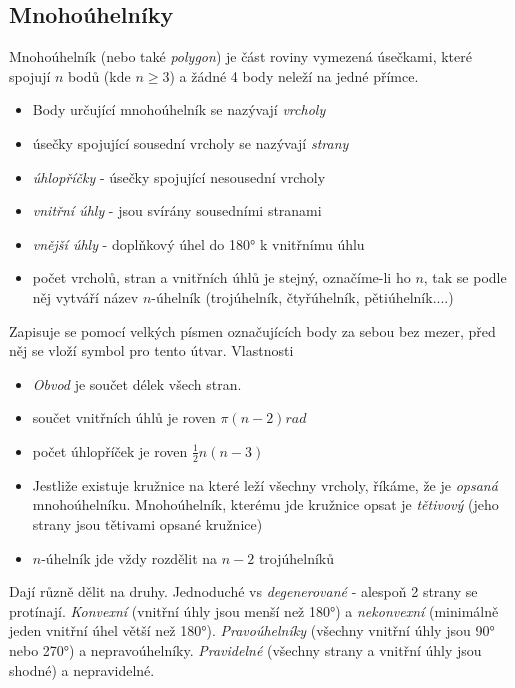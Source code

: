 \documentclass[12pt]{article}
\begin{document}
\subsection{Mnohoúhelníky}
Mnohoúhelník (nebo také \emph{polygon}) je část roviny vymezená úsečkami, které spojují $n$ bodů (kde $n\geq3$) a žádné 4 body neleží na jedné přímce.
\begin{itemize}
\item Body určující mnohoúhelník se nazývají \emph{vrcholy}
\item úsečky spojující sousední vrcholy se nazývají \emph{strany}
\item \emph{úhlopříčky} - úsečky spojující nesousední vrcholy
\item \emph{vnitřní úhly} - jsou svírány sousedními stranami
\item \emph{vnější úhly} - doplňkový úhel do 180° k vnitřnímu úhlu
\item počet vrcholů, stran a vnitřních úhlů je stejný, označíme-li ho $n$, tak se podle něj vytváří název $n$-úhelník (trojúhelník, čtyřúhelník, pětiúhelník....)
\end{itemize}
Zapisuje se pomocí velkých písmen označujících body za sebou bez mezer, před něj se vloží symbol pro tento útvar. Vlastnosti
\begin{itemize}
\item \emph{Obvod} je součet délek všech stran.
\item součet vnitřních úhlů je roven $\pi \left(n-2\right) rad$ 
\item počet úhlopříček je roven $\frac{1}{2}n(n-3)$
\item Jestliže existuje kružnice na které leží všechny vrcholy, říkáme, že je \emph{opsaná} mnohoúhelníku. Mnohoúhelník, kterému jde kružnice opsat je \emph{tětivový} (jeho strany jsou tětivami opsané kružnice)
\item $n$-úhelník jde vždy rozdělit na $n-2$ trojúhelníků
\end{itemize}
Dají různě dělit na druhy. Jednoduché vs \emph{degenerované} - alespoň 2 strany se protínají. \emph{Konvexní} (vnitřní úhly jsou menší než 180°) a \emph{nekonvexní} (minimálně jeden vnitřní úhel větší než 180°). \emph{Pravoúhelníky} (všechny vnitřní úhly jsou 90° nebo 270°) a nepravoúhelníky. \emph{Pravidelné} (všechny strany a vnitřní úhly jsou shodné) a nepravidelné.\\
\end{document}
